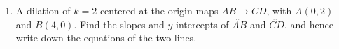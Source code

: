\documentclass[12pt, twoside]{article}
\begin{document}
\begin{enumerate}
  \item A dilation of $k=2$ centered at the origin maps $\overline{AB} \rightarrow \overline{CD}$, with $A(0,2)$ and $B(4,0)$. Find the slopes and $y$-intercepts of $\overleftrightarrow{AB}$ and $\overleftrightarrow{CD}$, and hence write down the equations of the two lines.



\end{enumerate}
\end{document}
